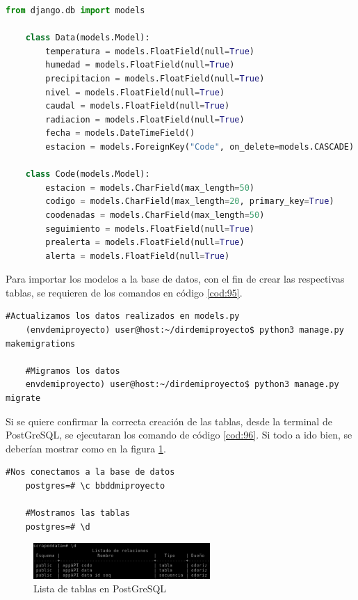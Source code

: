 \begin{lstlisting}[language=Python, caption={Modelos API Django}, label=cod:94]
	from django.db import models
	
	class Data(models.Model):
		temperatura = models.FloatField(null=True)
		humedad = models.FloatField(null=True)
		precipitacion = models.FloatField(null=True)
		nivel = models.FloatField(null=True)
		caudal = models.FloatField(null=True)
		radiacion = models.FloatField(null=True)
		fecha = models.DateTimeField()
		estacion = models.ForeignKey("Code", on_delete=models.CASCADE)
	
	class Code(models.Model):
		estacion = models.CharField(max_length=50)
		codigo = models.CharField(max_length=20, primary_key=True)
		coodenadas = models.CharField(max_length=50)
		seguimiento = models.FloatField(null=True)
		prealerta = models.FloatField(null=True)
		alerta = models.FloatField(null=True)
\end{lstlisting}

Para importar los modelos a la base de datos, con el fin de crear las respectivas tablas, se requieren de los comandos en código \ref{cod:95}.

\begin{lstlisting}[caption={Instrucción por consola para abrir models.py en un editor de texto}, label=cod:95]
	#Actualizamos los datos realizados en models.py
	(envdemiproyecto) user@host:~/dirdemiproyecto$ python3 manage.py makemigrations
	
	#Migramos los datos
	envdemiproyecto) user@host:~/dirdemiproyecto$ python3 manage.py migrate
\end{lstlisting}

Si se quiere confirmar la correcta creación de las tablas, desde la terminal de PostGreSQL, se ejecutaran los comando de código \ref{cod:96}. Si todo a ido bien, se deberían mostrar como en la figura \ref{fig:ej34}.

\begin{lstlisting}[caption={Instrucción por consola para abrir models.py en un editor de texto}, label=cod:96]
	#Nos conectamos a la base de datos
	postgres=# \c bbddmiproyecto
	
	#Mostramos las tablas
	postgres=# \d
\end{lstlisting}

\begin{figure} [H]
	\centering
	\includegraphics[width=0.6\textwidth]{fig/comprobacionTablasBBDD.png}
	\caption[Lista de tablas en PostGreSQL]{Lista de tablas en PostGreSQL}
	\label{fig:ej34}
\end{figure}

